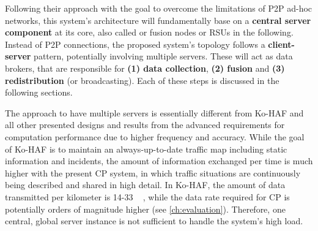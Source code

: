 Following their approach with the goal to overcome the limitations of P2P ad-hoc networks, this system's architecture will fundamentally base on a \textbf{central server component} at its core, also called or fusion nodes or RSUs in the following. Instead of P2P connections, the proposed system's topology follows a \textbf{client-server} pattern, potentially involving multiple servers. These will act as data brokers, that are responsible for \textbf{(1) data collection}, \textbf{(2) fusion} and \textbf{(3) redistribution} (or broadcasting). Each of these steps is discussed in the following sections.

The approach to have multiple servers is essentially different from Ko-HAF and all other presented designs and results from the advanced requirements for computation performance due to higher frequency and accuracy. While the goal of Ko-HAF is to maintain an always-up-to-date traffic map including static information and incidents, the amount of information exchanged per time is much higher with the present CP system, in which traffic situations are continuously being described and shared in high detail. In Ko-HAF, the amount of data transmitted per kilometer is 14-33 \si{\kilo\byte} \cite{Hohm2019}, while the data rate required for CP is potentially orders of magnitude higher (see \cref{ch:evaluation}). Therefore, one central, global server instance is not sufficient to handle the system's high load.

